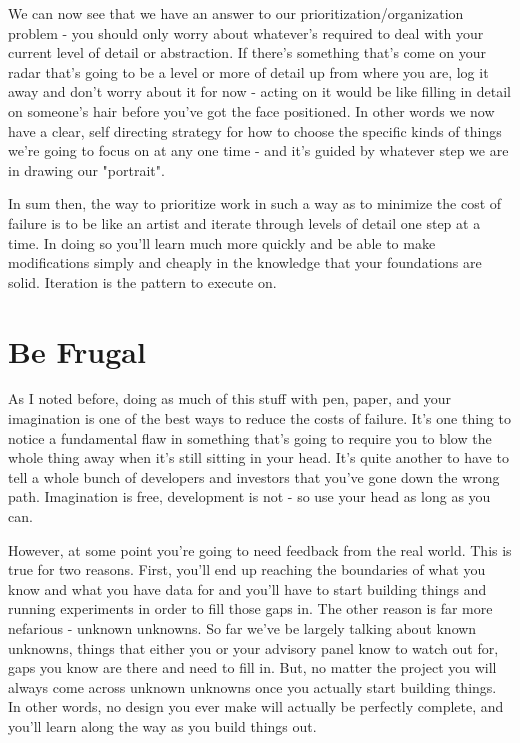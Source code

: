 \documentclass[11pt,a5paper]{book}
\begin{document}
We can now see that we have an answer to our prioritization/organization problem - you should only worry about whatever's required to deal with your current level of detail or abstraction. If there's something that's come on your radar that's going to be a level or more of detail up from where you are, log it away and don't worry about it for now - acting on it would be like filling in detail on someone's hair before you've got the face positioned. In other words we now have a clear, self directing strategy for how to choose the specific kinds of things we're going to focus on at any one time - and it's guided by whatever step we are in drawing our "portrait". 
\newline

In sum then, the way to prioritize work in such a way as to minimize the cost of failure is to be like an artist and iterate through levels of detail one step at a time. In doing so you'll learn much more quickly and be able to make modifications simply and cheaply in the knowledge that your foundations are solid. Iteration is the pattern to execute on.

\section{Be Frugal}
As I noted before, doing as much of this stuff with pen, paper, and your imagination is one of the best ways to reduce the costs of failure. It's one thing to notice a fundamental flaw in something that's going to require you to blow the whole thing away when it's still sitting in your head. It's quite another to have to tell a whole bunch of developers and investors that you've gone down the wrong path. Imagination is free, development is not - so use your head as long as you can.
\newline

However, at some point you're going to need feedback from the real world. This is true for two reasons. First, you'll end up reaching the boundaries of what you know and what you have data for and you'll have to start building things and running experiments in order to fill those gaps in. The other reason is far more nefarious - unknown unknowns. So far we've be largely talking about known unknowns, things that either you or your advisory panel know to watch out for, gaps you know are there and need to fill in. But, no matter the project you will always come across unknown unknowns once you actually start building things. In other words, no design you ever make will actually be perfectly complete, and you'll learn along the way as you build things out. 
\newline
\end{document}
